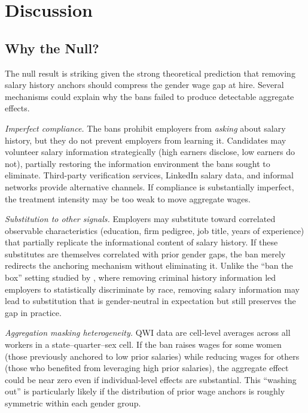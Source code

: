 \documentclass[12pt]{article}
\begin{document}



\section{Discussion}\label{sec:discussion}

\subsection{Why the Null?}

The null result is striking given the strong theoretical prediction that removing salary history anchors should compress the gender wage gap at hire. Several mechanisms could explain why the bans failed to produce detectable aggregate effects.

\textit{Imperfect compliance.} The bans prohibit employers from \textit{asking} about salary history, but they do not prevent employers from learning it. Candidates may volunteer salary information strategically (high earners disclose, low earners do not), partially restoring the information environment the bans sought to eliminate. Third-party verification services, LinkedIn salary data, and informal networks provide alternative channels. If compliance is substantially imperfect, the treatment intensity may be too weak to move aggregate wages.

\textit{Substitution to other signals.} Employers may substitute toward correlated observable characteristics (education, firm pedigree, job title, years of experience) that partially replicate the informational content of salary history. If these substitutes are themselves correlated with prior gender gaps, the ban merely redirects the anchoring mechanism without eliminating it. Unlike the ``ban the box'' setting studied by \citet{agan2018ban}, where removing criminal history information led employers to statistically discriminate by race, removing salary information may lead to substitution that is gender-neutral in expectation but still preserves the gap in practice.

\textit{Aggregation masking heterogeneity.} QWI data are cell-level averages across all workers in a state--quarter--sex cell. If the ban raises wages for some women (those previously anchored to low prior salaries) while reducing wages for others (those who benefited from leveraging high prior salaries), the aggregate effect could be near zero even if individual-level effects are substantial. This ``washing out'' is particularly likely if the distribution of prior wage anchors is roughly symmetric within each gender group.
\end{document}

